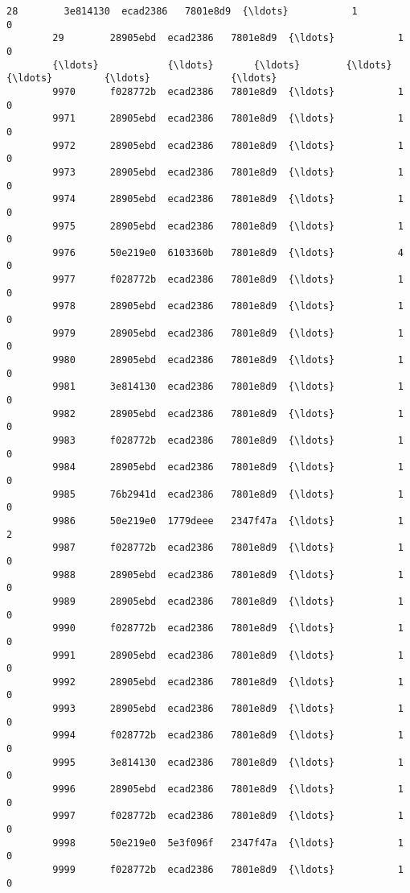 \documentclass[11pt]{article}
\begin{document}
\begin{Verbatim}[commandchars=\\\{\}]
        28        3e814130  ecad2386   7801e8d9  {\ldots}           1                0   
        29        28905ebd  ecad2386   7801e8d9  {\ldots}           1                0   
        {\ldots}            {\ldots}       {\ldots}        {\ldots}  {\ldots}         {\ldots}              {\ldots}   
        9970      f028772b  ecad2386   7801e8d9  {\ldots}           1                0   
        9971      28905ebd  ecad2386   7801e8d9  {\ldots}           1                0   
        9972      28905ebd  ecad2386   7801e8d9  {\ldots}           1                0   
        9973      28905ebd  ecad2386   7801e8d9  {\ldots}           1                0   
        9974      28905ebd  ecad2386   7801e8d9  {\ldots}           1                0   
        9975      28905ebd  ecad2386   7801e8d9  {\ldots}           1                0   
        9976      50e219e0  6103360b   7801e8d9  {\ldots}           4                0   
        9977      f028772b  ecad2386   7801e8d9  {\ldots}           1                0   
        9978      28905ebd  ecad2386   7801e8d9  {\ldots}           1                0   
        9979      28905ebd  ecad2386   7801e8d9  {\ldots}           1                0   
        9980      28905ebd  ecad2386   7801e8d9  {\ldots}           1                0   
        9981      3e814130  ecad2386   7801e8d9  {\ldots}           1                0   
        9982      28905ebd  ecad2386   7801e8d9  {\ldots}           1                0   
        9983      f028772b  ecad2386   7801e8d9  {\ldots}           1                0   
        9984      28905ebd  ecad2386   7801e8d9  {\ldots}           1                0   
        9985      76b2941d  ecad2386   7801e8d9  {\ldots}           1                0   
        9986      50e219e0  1779deee   2347f47a  {\ldots}           1                2   
        9987      f028772b  ecad2386   7801e8d9  {\ldots}           1                0   
        9988      28905ebd  ecad2386   7801e8d9  {\ldots}           1                0   
        9989      28905ebd  ecad2386   7801e8d9  {\ldots}           1                0   
        9990      f028772b  ecad2386   7801e8d9  {\ldots}           1                0   
        9991      28905ebd  ecad2386   7801e8d9  {\ldots}           1                0   
        9992      28905ebd  ecad2386   7801e8d9  {\ldots}           1                0   
        9993      28905ebd  ecad2386   7801e8d9  {\ldots}           1                0   
        9994      f028772b  ecad2386   7801e8d9  {\ldots}           1                0   
        9995      3e814130  ecad2386   7801e8d9  {\ldots}           1                0   
        9996      28905ebd  ecad2386   7801e8d9  {\ldots}           1                0   
        9997      f028772b  ecad2386   7801e8d9  {\ldots}           1                0   
        9998      50e219e0  5e3f096f   2347f47a  {\ldots}           1                0   
        9999      f028772b  ecad2386   7801e8d9  {\ldots}           1                0   
        

\end{Verbatim}
\end{document}
